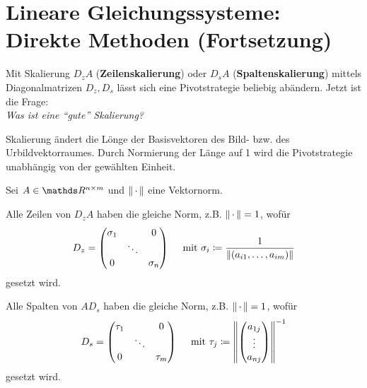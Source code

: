 %
%
%
%



\chapter{Lineare Gleichungssysteme: Direkte Methoden (Fortsetzung)}


Mit Skalierung $D_zA$ (\textbf{Zeilenskalierung}) oder
$D_sA$ (\textbf{Spaltenskalierung})
mittels Diagonalmatrizen $D_z, D_s$ lässt sich eine Pivotstrategie beliebig abändern.
Jetzt ist die Frage: \\
\textit{Was ist eine \enquote{gute} Skalierung?}

Skalierung ändert die Lönge der Basisvektoren des Bild- bzw. des Urbildvektorraumes.
Durch Normierung der Länge auf 1 wird die Pivotstrategie unabhängig von der 
gewählten Einheit.

Sei $A\in\Renm $ und $\left\| \,\cdot\, \right\| $ eine Vektornorm.


 
Alle Zeilen von $D_zA$ haben die gleiche Norm, z.B. $\left\| \,\cdot\, \right\| =1$, wofür 
\begin{gather}
D_z = \begin{pmatrix}
\sigma_1 & & 0 \\
&\ddots & \\ 
0 && \sigma_n
\end{pmatrix}
\quad \text{ mit }\sigma_i\coloneqq \frac{1}{\left\| (a_{i1}, \dots , a_{im}) \right\|}
\label{IV.1.1}
\end{gather}
gesetzt wird.


 
Alle Spalten von $AD_s$ haben die gleiche Norm, z.B. $\left\| \,\cdot\, \right\| =1$, wofür 
\begin{gather}
D_s = \begin{pmatrix}
\tau_1 & & 0 \\
&\ddots & \\ 
0 && \tau_m
\end{pmatrix}
\quad \text{ mit }\tau_j\coloneqq \left\| \begin{pmatrix}
	a_{1j} \\ \vdots \\ a_{nj}
	\end{pmatrix} \right\|^{-1}
\label{IV.1.2}
\end{gather}
gesetzt wird.

